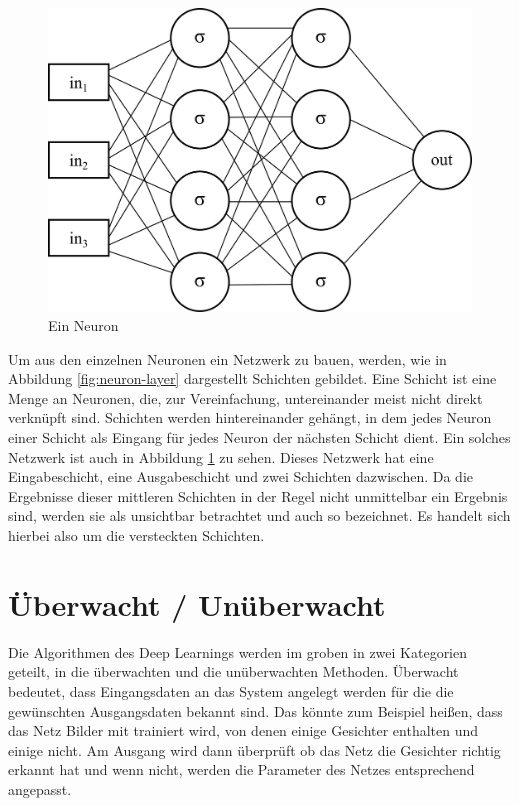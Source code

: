\begin{figure}
\centering
\includegraphics[scale=1]{images/neuron-network.png}
\caption{Ein Neuron}
\label{fig:neuron-network}
\end{figure}

Um aus den einzelnen Neuronen ein Netzwerk zu bauen, werden, wie in Abbildung \ref{fig:neuron-layer} dargestellt Schichten gebildet. Eine Schicht ist eine Menge an Neuronen, die, zur Vereinfachung, untereinander meist nicht direkt verknüpft sind. Schichten werden hintereinander gehängt, in dem jedes Neuron einer Schicht als Eingang für jedes Neuron der nächsten Schicht dient. Ein solches Netzwerk ist auch in Abbildung \ref{fig:neuron-network} zu sehen. Dieses Netzwerk hat eine Eingabeschicht, eine Ausgabeschicht und zwei Schichten dazwischen. Da die Ergebnisse dieser mittleren Schichten in der Regel nicht unmittelbar ein Ergebnis sind, werden sie als unsichtbar betrachtet und auch so bezeichnet. Es handelt sich hierbei also um die versteckten Schichten.

\section{Überwacht / Unüberwacht}

Die Algorithmen des Deep Learnings werden im groben in zwei Kategorien geteilt, in die überwachten und die unüberwachten Methoden. Überwacht bedeutet, dass Eingangsdaten an das System angelegt werden für die die gewünschten Ausgangsdaten bekannt sind. Das könnte zum Beispiel heißen, dass das Netz Bilder mit trainiert wird, von denen einige Gesichter enthalten und einige nicht. Am Ausgang wird dann überprüft ob das Netz die Gesichter richtig erkannt hat und wenn nicht, werden die Parameter des Netzes entsprechend angepasst.

